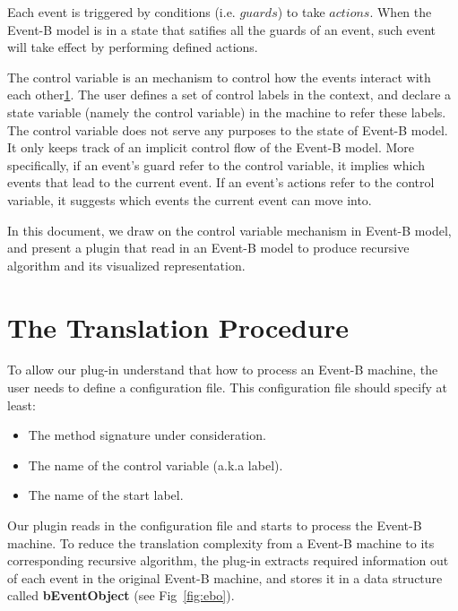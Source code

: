 \documentclass{easychair}
\begin{document}
Each event is triggered by conditions (i.e. $guards$) to take $actions$. When the Event-B model is in a state that satifies all the guards of an event, such event will take effect by performing defined actions.

The control variable is an mechanism to control how the events interact with each other\ref{}. The user defines a set of control labels in the context, and declare a state variable (namely the control variable) in the machine to refer these labels. The control variable does not serve any purposes to the state of Event-B model. It only keeps track of an implicit control flow of the Event-B model. More specifically, if an event's guard refer to the control variable, it implies which events that lead to the current event. If an event's actions refer to the control variable, it suggests which events the current event can move into. 

In this document, we draw on the control variable mechanism in Event-B model, and present a plugin that read in an Event-B model to produce recursive algorithm and its visualized representation.
 
\section{The Translation Procedure}
To allow our plug-in understand that how to process an Event-B machine, the user needs to define a configuration file. This configuration file should specify at least:
\begin{itemize}
	\item The method signature under consideration.
	\item The name of the control variable (a.k.a label).
	\item The name of the start label.
\end{itemize}

Our plugin reads in the configuration file and starts to process the Event-B machine. To reduce the translation complexity from a Event-B machine to its corresponding recursive algorithm, the plug-in extracts required information out of each event in the original Event-B machine, and stores it in a data structure called \textbf{bEventObject} (see Fig~\ref{fig:ebo}). 
\end{document}
